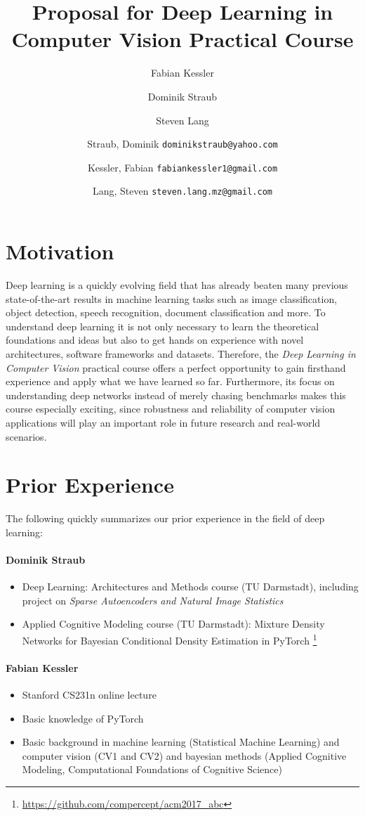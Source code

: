 \documentclass[11pt,english]{article}
\title{Proposal for Deep Learning in Computer Vision Practical Course}
\author{Fabian Kessler}
\author{Dominik Straub}
\author{Steven Lang}
\author{
	Straub, Dominik \texttt{dominikstraub@yahoo.com}
	\and
	Kessler, Fabian \texttt{fabiankessler1@gmail.com}
	\and
	Lang, Steven \texttt{steven.lang.mz@gmail.com}\\
}
\begin{document}
\maketitle
\section{Motivation}
Deep learning is a quickly evolving field that has already beaten many previous state-of-the-art results in machine learning tasks such as image classification, object detection, speech recognition, document classification and more. To understand deep learning it is not only necessary to learn the theoretical foundations and ideas but also to get hands on experience with novel architectures, software frameworks and datasets. Therefore, the \textit{Deep Learning in Computer Vision} practical course offers a perfect opportunity to gain firsthand experience and apply what we have learned so far. Furthermore, its focus on understanding deep networks instead of merely chasing benchmarks makes this course especially exciting, since robustness and reliability of computer vision applications will play an important role in future research and real-world scenarios.

\section{Prior Experience}
The following quickly summarizes our prior experience in the field of deep learning:

\paragraph{Dominik Straub}
\begin{itemize}
    \setlength\itemsep{-0.25em}
    \item Deep Learning: Architectures and Methods course (TU Darmstadt), including project on \textit{Sparse Autoencoders and Natural Image Statistics}
    \item Applied Cognitive Modeling course (TU Darmstadt): Mixture Density Networks for Bayesian Conditional Density Estimation in PyTorch \footnote{\url{https://github.com/compercept/acm2017_abc}}
\end{itemize}
\paragraph{Fabian Kessler}
\begin{itemize}
    \setlength\itemsep{-0.25em}
    \item Stanford CS231n online lecture 
    \item Basic knowledge of PyTorch
    \item Basic background in machine learning (Statistical Machine Learning) and computer vision (CV1 and CV2) and bayesian methods (Applied Cognitive Modeling, Computational Foundations of Cognitive Science)
\end{itemize}
\end{document}
